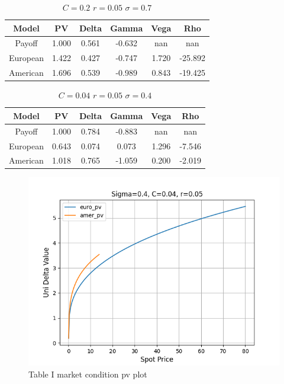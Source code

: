 \documentclass[conference]{IEEEtran}
\begin{document}
\begin{table}[htbp] \caption{$C= 0.2$   $r= 0.05$  $\sigma= 0.7$} \centering \begin{tabular}{|c|c|c|c|c|c|} \hline \textbf{Model} & \textbf{PV} & \textbf{Delta} & \textbf{Gamma} & \textbf{Vega} & \textbf{Rho} \\ \hline Payoff & 1.000 & 0.561 & -0.632 & nan & nan \\ European & 1.422 & 0.427 & -0.747 & 1.720 & -25.892 \\ American & 1.696 & 0.539 & -0.989 & 0.843 & -19.425 \\ \hline
\end{tabular} 
\label{good market condition}
\end{table}



\begin{table}[htbp] \caption{$C= 0.04$  $r= 0.05$  $\sigma= 0.4$} \centering \begin{tabular}{|c|c|c|c|c|c|} \hline \textbf{Model} & \textbf{PV} & \textbf{Delta} & \textbf{Gamma} & \textbf{Vega} & \textbf{Rho} \\ \hline Payoff & 1.000 & 0.784 & -0.883 & nan & nan \\ European & 0.643 & 0.074 & 0.073 & 1.296 & -7.546 \\ American & 1.018 & 0.765 & -1.059 & 0.200 & -2.019 \\ \hline \end{tabular} 
\label{bad market condition}
\end{table}

\begin{figure}
    \centering
    \includegraphics[width=1\linewidth]{figures/good-market-situation-plot.png}
    \caption{Table I market condition pv plot}
    \label{fig:good market situation plot}
\end{figure}
\end{document}
